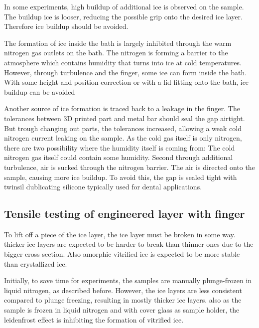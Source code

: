 In some experiments, high buildup of additional ice is observed on the sample. The buildup ice is looser, reducing the possible grip onto the desired ice layer. Therefore ice buildup should be avoided.

The formation of ice inside the bath is largely inhibited through the warm nitrogen gas outlets on the bath. The nitrogen is forming a barrier to the atmosphere which contains humidity that turns into ice at cold temperatures. However, through turbulence and the finger, some ice can form inside the bath. With some height and position correction or with a lid fitting onto the bath, ice buildup can be avoided

Another source of ice formation is traced back to a leakage in the finger. The tolerances between 3D printed part and metal bar should seal the gap airtight. But trough changing out parts, the tolerances increased, allowing a weak cold nitrogen current leaking on the sample. As the cold gas itself is only nitrogen, there are two possibility where the humidity itself is coming from: The cold nitrogen gas itself could contain some humidity. Second through additional turbulence, air is sucked through the nitrogen barrier. The air is directed onto the sample, causing more ice buildup. To avoid this, the gap is sealed tight with twinsil dublicating silicone typically used for dental applications.

\subsection{Tensile testing of engineered layer with finger}

To lift off a piece of the ice layer, the ice layer must be broken in some way. thicker ice layers are expected to be harder to break than thinner ones due to the bigger cross section. Also amorphic vitrified ice is expected to be more stable than crystallized ice.

Initially, to save time for experiments, the samples are manually plunge-frozen in liquid nitrogen, as described before. However, the ice layers are less consistent compared to plunge freezing, resulting in mostly thicker ice layers. also as the sample is frozen in liquid nitrogen and with cover glass as sample holder, the leidenfrost effect is inhibiting the formation of vitrified ice.


